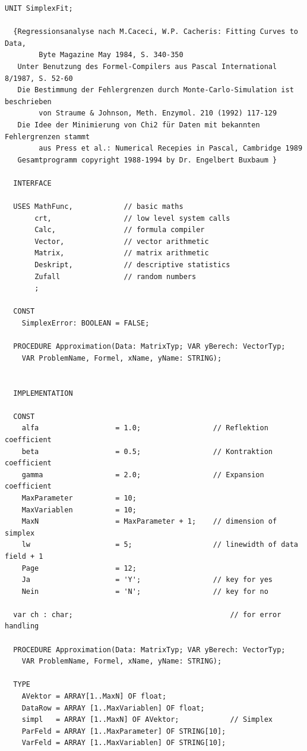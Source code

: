 \begin{refsection}
\begin{lstlisting}[caption=Simplex]
  UNIT SimplexFit;

  {Regressionsanalyse nach M.Caceci, W.P. Cacheris: Fitting Curves to Data,
        Byte Magazine May 1984, S. 340-350
   Unter Benutzung des Formel-Compilers aus Pascal International 8/1987, S. 52-60
   Die Bestimmung der Fehlergrenzen durch Monte-Carlo-Simulation ist beschrieben
        von Straume & Johnson, Meth. Enzymol. 210 (1992) 117-129
   Die Idee der Minimierung von Chi2 für Daten mit bekannten Fehlergrenzen stammt
        aus Press et al.: Numerical Recepies in Pascal, Cambridge 1989
   Gesamtprogramm copyright 1988-1994 by Dr. Engelbert Buxbaum }

  INTERFACE

  USES MathFunc,            // basic maths
       crt,                 // low level system calls
       Calc,                // formula compiler
       Vector,              // vector arithmetic
       Matrix,              // matrix arithmetic
       Deskript,            // descriptive statistics
       Zufall               // random numbers
       ;

  CONST
    SimplexError: BOOLEAN = FALSE;

  PROCEDURE Approximation(Data: MatrixTyp; VAR yBerech: VectorTyp;
    VAR ProblemName, Formel, xName, yName: STRING);


  IMPLEMENTATION

  CONST
    alfa                  = 1.0;                 // Reflektion coefficient
    beta                  = 0.5;                 // Kontraktion coefficient
    gamma                 = 2.0;                 // Expansion coefficient
    MaxParameter          = 10;
    MaxVariablen          = 10;
    MaxN                  = MaxParameter + 1;    // dimension of simplex
    lw                    = 5;                   // linewidth of data field + 1
    Page                  = 12;
    Ja                    = 'Y';                 // key for yes
    Nein                  = 'N';                 // key for no

  var ch : char;                                     // for error handling

  PROCEDURE Approximation(Data: MatrixTyp; VAR yBerech: VectorTyp;
    VAR ProblemName, Formel, xName, yName: STRING);

  TYPE
    AVektor = ARRAY[1..MaxN] OF float;
    DataRow = ARRAY [1..MaxVariablen] OF float;
    simpl   = ARRAY [1..MaxN] OF AVektor;            // Simplex
    ParFeld = ARRAY [1..MaxParameter] OF STRING[10];
    VarFeld = ARRAY [1..MaxVariablen] OF STRING[10];


\end{lstlisting}
\end{refsection}
